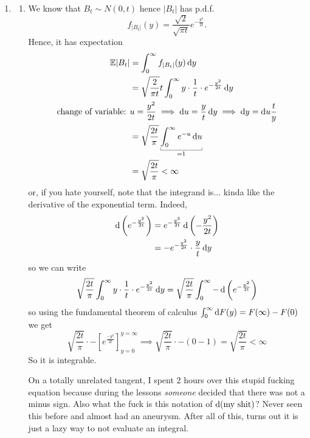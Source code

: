 \documentclass[12pt]{report}
\begin{document}
\begin{fancyproof}
\begin{enumerate}
		\item \begin{enumerate}
		\item We know that $B_{t}\sim N(0,t)$ hence $|B_{t}|$ has p.d.f.
		\begin{equation*}
			f_{|B_{t}|}(y)=\frac{\sqrt{2}}{\sqrt{\pi t}}e^{-\frac{y^{2}}{2t}}.
		\end{equation*}
		Hence, it has expectation
		\begin{align*}
			\evs|B_{t}|&=\int_{0}^{\infty}f_{|B_{t}|}(y)\dy\\
			&=\sqrt{\frac{2}{\pi t}}t\int_{0}^{\infty}y\cdot\frac{1}{t}\cdot e^{-\frac{y^{2}}{2t}}\dy\\
			\text{change of variable: }&u=\frac{y^{2}}{2t}\implies \du=\frac{y}{t}\dy\implies\dy=\du\frac{t}{y}\\
			&=\sqrt{\frac{2t}{\pi}}\ubracketthin{\int_{0}^{\infty}e^{-u}\du}_{=1}\\
			&=\sqrt{\frac{2t}{\pi}}<\infty
		\end{align*}
		or, if you hate yourself, note that the integrand is... kinda like the derivative of the exponential term. Indeed,
		\begin{align*}
\mathop{}\!\mathrm{d}\left(e^{-\frac{y^{2}}{2t}}\right)
			&=e^{-\frac{y^{2}}{2t}}\mathop{}\!\mathrm{d}\left(-\frac{y^{2}}{2t}\right)\\
			&=-e^{-\frac{y^{2}}{2t}}\cdot\frac{y}{t}\mathop{}\!\mathrm{d} y
		\end{align*}
		so we can write
		\begin{equation*}
				\sqrt{\frac{2t}{\pi}}\int_{0}^{\infty}y\cdot\frac{1}{t}\cdot e^{-\frac{y^{2}}{2t}}\mathop{}\!\mathrm{d} y=\sqrt{\frac{2t}{\pi}}\int_{0}^{\infty}-\mathop{}\!\mathrm{d}\left(e^{-\frac{y^{2}}{2t}}\right)
		\end{equation*}
	so using the fundamental theorem of calculus $\int_{0}^{\infty}\mathop{}\!\mathrm{d} F(y)=F(\infty)-F(0)$ we get
	\begin{equation*}
		\sqrt{\frac{2t}{\pi}}\cdot-\left[e^{\frac{-y^{2}}{2t}}\right]^{y=\infty}_{y=0}\implies\sqrt{\frac{2t}{\pi}}\cdot-(0-1)=\sqrt{\frac{2t}{\pi}}<\infty
	\end{equation*}
		So it is integrable. 
		\begin{insult}
			On a totally unrelated tangent, I spent 2 hours over this stupid fucking equation because during the lessons \textit{someone} decided that there was not a minus sign. Also what the fuck is this notation of $\mathop{}\!\mathrm{d}({\text{my shit}})$? Never seen this before and almost had an aneurysm. After all of this, turns out it is just a lazy way to not evaluate an integral.

\end{insult}
\end{enumerate}
\end{enumerate}
\end{fancyproof}
\end{document}

